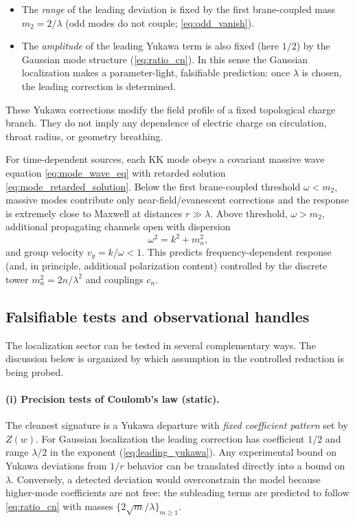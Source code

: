 \documentclass[11pt]{article}
\newcommand{\Z}{Z}
\newcommand{\lam}{\lambda}      %
\begin{document}
\begin{itemize}
\item The \emph{range} of the leading deviation is fixed by the first brane-coupled
mass \(m_2=2/\lam\) (odd modes do not couple; \cref{eq:odd_vanish}).

\item The \emph{amplitude} of the leading Yukawa term is also fixed (here \(1/2\))
by the Gaussian mode structure (\cref{eq:ratio_cn}). In this sense the Gaussian
localization makes a parameter-light, falsifiable prediction: once \(\lam\) is
chosen, the leading correction is determined.
\end{itemize}

These Yukawa corrections modify the field profile of a fixed topological charge
branch. They do not imply any dependence of electric charge on circulation,
throat radius, or geometry breathing.

For time-dependent sources, each KK mode obeys a covariant massive wave equation
\cref{eq:mode_wave_eq} with retarded solution \cref{eq:mode_retarded_solution}.
Below the first brane-coupled threshold \(\omega<m_2\), massive modes contribute
only near-field/evanescent corrections and the response is extremely close to
Maxwell at distances \(r\gg\lam\). Above threshold, \(\omega>m_2\), additional
propagating channels open with dispersion
\begin{equation}
  \omega^2 = k^2 + m_n^2,
\end{equation}
and group velocity \(v_g = k/\omega < 1\). This predicts frequency-dependent
response (and, in principle, additional polarization content) controlled by the
discrete tower \(m_n^2=2n/\lam^2\) and couplings \(c_n\).

\subsection{Falsifiable tests and observational handles}
The localization sector can be tested in several complementary ways. The
discussion below is organized by which assumption in the controlled reduction is
being probed.

\paragraph{(i) Precision tests of Coulomb's law (static).}
The cleanest signature is a Yukawa departure with \emph{fixed coefficient pattern}
set by \(\Z(w)\). For Gaussian localization the leading correction has coefficient
\(1/2\) and range \(\lam/2\) in the exponent (\cref{eq:leading_yukawa}). Any
experimental bound on Yukawa deviations from \(1/r\) behavior can be translated
directly into a bound on \(\lam\). Conversely, a detected deviation would overconstrain
the model because higher-mode coefficients are not free: the subleading terms are
predicted to follow \cref{eq:ratio_cn} with masses \(\{2\sqrt{m}/\lam\}_{m\ge1}\).
\end{document}
